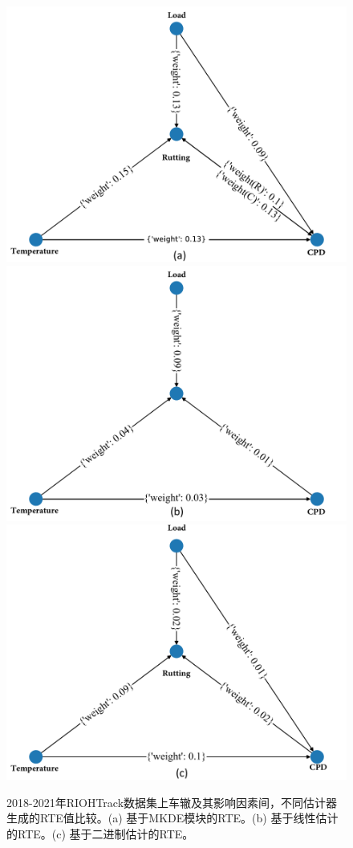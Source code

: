 \begin{figure}[H]
\begin{center}
\includegraphics[scale=0.3]{./ch3/fig3_19.pdf}
\includegraphics[scale=0.3]{./ch3/fig3_20.pdf}
\includegraphics[scale=0.3]{./ch3/fig3_21.pdf}
\caption{2018-2021年RIOHTrack数据集上车辙及其影响因素间，不同估计器生成的RTE值比较。(a) 基于MKDE模块的RTE。(b) 基于线性估计的RTE。(c) 基于二进制估计的RTE。} \label{Figure12}
\end{center}
\end{figure}


